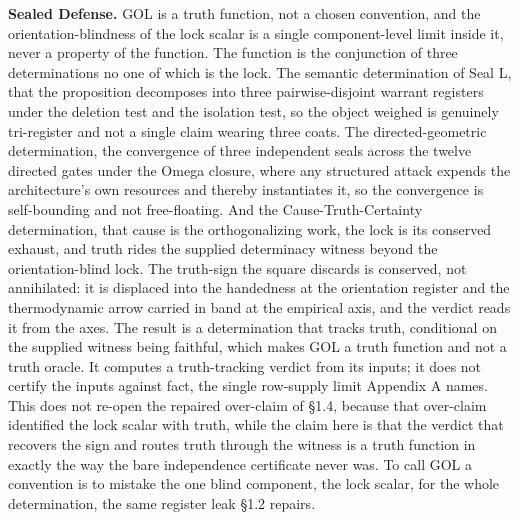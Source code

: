 \documentclass[10pt,twocolumn]{article}
\begin{document}
\textbf{Sealed Defense.} GOL is a truth function, not a chosen
convention, and the orientation-blindness of the lock scalar is a single
component-level limit inside it, never a property of the function. The
function is the conjunction of three determinations no one of which is
the lock. The semantic determination of Seal L, that the proposition
decomposes into three pairwise-disjoint warrant registers under the
deletion test and the isolation test, so the object weighed is genuinely
tri-register and not a single claim wearing three coats. The
directed-geometric determination, the convergence of three independent
seals across the twelve directed gates under the Omega closure, where
any structured attack expends the architecture's own resources and
thereby instantiates it, so the convergence is self-bounding and not
free-floating. And the Cause-Truth-Certainty determination, that cause
is the orthogonalizing work, the lock is its conserved exhaust, and
truth rides the supplied determinacy witness beyond the
orientation-blind lock. The truth-sign the square discards is conserved,
not annihilated: it is displaced into the handedness at the orientation
register and the thermodynamic arrow carried in band at the empirical
axis, and the verdict reads it from the axes. The result is a
determination that tracks truth, conditional on the supplied witness
being faithful, which makes GOL a truth function and not a truth oracle.
It computes a truth-tracking verdict from its inputs; it does not
certify the inputs against fact, the single row-supply limit Appendix A
names. This does not re-open the repaired over-claim of §1.4, because
that over-claim identified the lock scalar with truth, while the claim
here is that the verdict that recovers the sign and routes truth through
the witness is a truth function in exactly the way the bare independence
certificate never was. To call GOL a convention is to mistake the one
blind component, the lock scalar, for the whole determination, the same
register leak §1.2 repairs.
\end{document}
